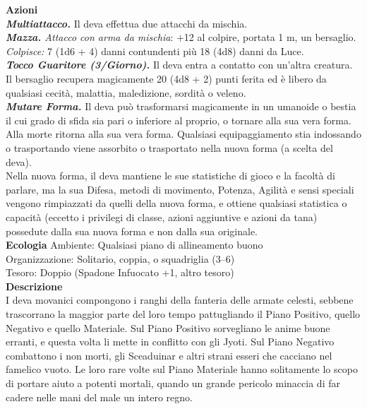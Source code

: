 \begin{multicols}{2}
\smallskip\textbf{Azioni}\\
\emph{\textbf{Multiattacco.}} Il deva effettua due attacchi da mischia.\\
\emph{\textbf{Mazza.} Attacco con arma da mischia}: +12 al colpire, portata 1 m, un bersaglio.\\ 
\emph{Colpisce:} 7 (1d6 + 4) danni contundenti più 18 (4d8) danni da Luce.\\
\emph{\textbf{Tocco Guaritore (3/Giorno).}} Il deva entra a contatto con un'altra creatura. Il bersaglio recupera magicamente 20 (4d8 + 2) punti ferita ed è libero da qualsiasi cecità, malattia, maledizione, sordità o veleno.\\
\emph{\textbf{Mutare Forma.}} Il deva può trasformarsi magicamente in un umanoide o bestia il cui grado di sfida sia pari o inferiore al proprio, o tornare alla sua vera forma. Alla morte ritorna alla sua vera forma. Qualsiasi equipaggiamento stia indossando o trasportando viene assorbito o trasportato nella nuova forma (a scelta del deva).\\
Nella nuova forma, il deva mantiene le sue statistiche di gioco e la facoltà di parlare, ma la sua Difesa, metodi di movimento, Potenza, Agilità e sensi speciali vengono rimpiazzati da quelli della nuova forma, e ottiene qualsiasi statistica o capacità (eccetto i privilegi di classe, azioni aggiuntive e azioni da tana) possedute dalla sua nuova forma e non dalla sua originale.\\
\textbf{Ecologia}
Ambiente: Qualsiasi piano di allineamento buono\\
Organizzazione: Solitario, coppia, o squadriglia (3–6)\\
Tesoro: Doppio (Spadone Infuocato +1, altro tesoro)\\
\textbf{Descrizione}\\
I deva movanici compongono i ranghi della fanteria delle armate celesti, sebbene trascorrano la maggior parte del loro tempo pattugliando il Piano Positivo, quello Negativo e quello Materiale. Sul Piano Positivo sorvegliano le anime buone erranti, e questa volta li mette in conflitto con gli Jyoti. Sul Piano Negativo combattono i non morti, gli Sceaduinar e altri strani esseri che cacciano nel famelico vuoto. Le loro rare volte sul Piano Materiale hanno solitamente lo scopo di portare aiuto a potenti mortali, quando un grande pericolo minaccia di far cadere nelle mani del male un intero regno.\\


\end{multicols}

